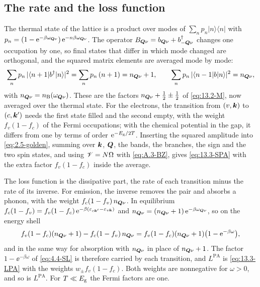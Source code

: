 \subsection*{The rate and the loss function}

The thermal state of the lattice is a product over modes of $\sum_np_n|n\rangle\langle n|$ with $p_n = (1 - \mathrm{e}^{-\beta\omega_{\bm{Q}\nu}})\,\mathrm{e}^{-n\beta\omega_{\bm{Q}\nu}}$. The operator $B_{\bm{Q}\nu} = b_{\bm{Q}\nu} + b^\dagger_{-\bm{Q}\nu}$ changes one occupation by one, so final states that differ in which mode changed are orthogonal, and the squared matrix elements are averaged mode by mode:
\begin{equation*}
  \sum_np_n\,|\langle n+1|b^\dagger|n\rangle|^2 = \sum_np_n\,(n+1) = n_{\bm{Q}\nu} + 1 , \qquad
  \sum_np_n\,|\langle n-1|b|n\rangle|^2 = n_{\bm{Q}\nu} ,
\end{equation*}
with $n_{\bm{Q}\nu} = n_{\mathrm{B}}(\omega_{\bm{Q}\nu})$. These are the factors $n_{\bm{Q}\nu} + \frac12 \pm \frac12$ of \cref{eq:13.2-M}, now averaged over the thermal state. For the electrons, the transition from $(v,\bm{k})$ to $(c,\bm{k}')$ needs the first state filled and the second empty, with the weight $f_v(1 - f_c)$ of the Fermi occupations; with the chemical potential in the gap, it differs from one by terms of order $\mathrm{e}^{-E_{\mathrm{g}}/2T}$. Inserting the squared amplitude into \cref{eq:2.5-golden}, summing over $\bm{k}$, $\bm{Q}$, the bands, the branches, the sign and the two spin states, and using $\mathscr{V} = N\Omega$ with \cref{eq:A.3-BZ}, gives \cref{eq:13.3-SPA} with the extra factor $f_v(1 - f_c)$ inside the average.

The loss function is the dissipative part, the rate of each transition minus the rate of its inverse. For emission, the inverse removes the pair and absorbs a phonon, with the weight $f_c(1 - f_v)\,n_{\bm{Q}\nu}$. In equilibrium $f_c(1 - f_v) = f_v(1 - f_c)\,\mathrm{e}^{-\beta(\varepsilon_{c\bm{k}'} - \varepsilon_{v\bm{k}})}$ and $n_{\bm{Q}\nu} = (n_{\bm{Q}\nu} + 1)\,\mathrm{e}^{-\beta\omega_{\bm{Q}\nu}}$, so on the energy shell
\begin{equation*}
  f_v(1 - f_c)(n_{\bm{Q}\nu} + 1) - f_c(1 - f_v)\,n_{\bm{Q}\nu} = f_v(1 - f_c)(n_{\bm{Q}\nu} + 1)\bigl(1 - \mathrm{e}^{-\beta\omega}\bigr) ,
\end{equation*}
and in the same way for absorption with $n_{\bm{Q}\nu}$ in place of $n_{\bm{Q}\nu} + 1$. The factor $1 - \ee^{-\beta\omega}$ of \cref{eq:4.4-SL} is therefore carried by each transition, and $L^{\mathrm{PA}}$ is \cref{eq:13.3-LPA} with the weights $w_\pm f_v(1 - f_c)$. Both weights are nonnegative for $\omega > 0$, and so is $L^{\mathrm{PA}}$. For $T \ll E_{\mathrm{g}}$ the Fermi factors are one.
